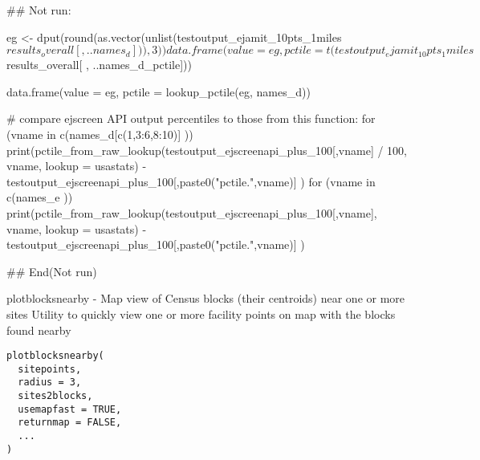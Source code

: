 \documentclass[a4paper]{book}
\begin{document}
\begin{Examples}
\begin{ExampleCode}
## Not run: 

eg <- dput(round(as.vector(unlist(testoutput_ejamit_10pts_1miles$results_overall[ , ..names_d] )),3))

data.frame(value = eg, pctile = t(testoutput_ejamit_10pts_1miles$results_overall[ , ..names_d_pctile]))

data.frame(value = eg, pctile = lookup_pctile(eg, names_d))


  # compare ejscreen API output percentiles to those from this function:
  for (vname in c(names_d[c(1,3:6,8:10)] )) {
     print(pctile_from_raw_lookup(testoutput_ejscreenapi_plus_100[,vname] / 100, vname, 
       lookup = usastats) 
       - testoutput_ejscreenapi_plus_100[,paste0("pctile.",vname)] )
  }
  for (vname in c(names_e )) {
     print(pctile_from_raw_lookup(testoutput_ejscreenapi_plus_100[,vname], vname, 
       lookup = usastats)
         - testoutput_ejscreenapi_plus_100[,paste0("pctile.",vname)] )
  }

## End(Not run)
\end{ExampleCode}
\end{Examples}
%
\begin{Description}\relax
plotblocksnearby - Map view of Census blocks (their centroids) near one or more sites
Utility to quickly view one or more facility points on map with the blocks found nearby
\end{Description}
%
\begin{Usage}
\begin{verbatim}
plotblocksnearby(
  sitepoints,
  radius = 3,
  sites2blocks,
  usemapfast = TRUE,
  returnmap = FALSE,
  ...
)
\end{verbatim}
\end{Usage}
%
\end{document}
